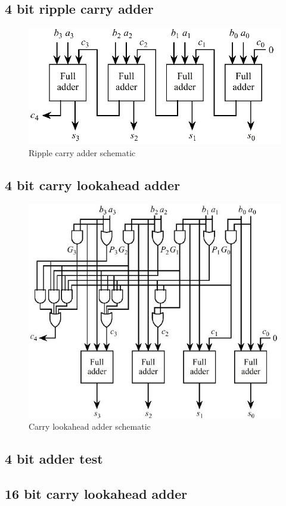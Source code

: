 \documentclass[a4paper]{article}
\begin{document}
    \subsection{4 bit ripple carry adder}
        \begin{figure}[b]
            \centering
            \includegraphics[width=\textwidth]{ripple-carry-adder}
            \caption{Ripple carry adder schematic}
        \end{figure}
        

    \subsection{4 bit carry lookahead adder}
        \begin{figure}[b]
            \centering
            \includegraphics[width=\textwidth]{carry-lookahead-adder}
            \caption{Carry lookahead adder schematic}
        \end{figure}
        

    \subsection{4 bit adder test}
        

\clearpage

    \subsection{16 bit carry lookahead adder}
        

\null
\vfill


\end{document}
